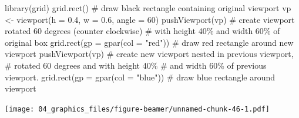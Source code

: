 \documentclass[
  9pt,
  a4paper,
  ignorenonframetext,
  notheorems]{beamer}
\newenvironment{Shaded}{\begin{snugshade}}{\end{snugshade}}
\newcommand{\AttributeTok}[1]{\textcolor[rgb]{0.40,0.45,0.13}{#1}}
\newcommand{\CommentTok}[1]{\textcolor[rgb]{0.37,0.37,0.37}{#1}}
\newcommand{\DecValTok}[1]{\textcolor[rgb]{0.68,0.00,0.00}{#1}}
\newcommand{\FloatTok}[1]{\textcolor[rgb]{0.68,0.00,0.00}{#1}}
\newcommand{\FunctionTok}[1]{\textcolor[rgb]{0.28,0.35,0.67}{#1}}
\newcommand{\NormalTok}[1]{\textcolor[rgb]{0.00,0.23,0.31}{#1}}
\newcommand{\OtherTok}[1]{\textcolor[rgb]{0.00,0.23,0.31}{#1}}
\newcommand{\StringTok}[1]{\textcolor[rgb]{0.13,0.47,0.30}{#1}}
\begin{document}
\begin{frame}[fragile]
\begin{Shaded}
\begin{Highlighting}[]
\FunctionTok{library}\NormalTok{(grid)}
\FunctionTok{grid.rect}\NormalTok{() }\CommentTok{\# draw black rectangle containing original viewport}
\NormalTok{vp }\OtherTok{\textless{}{-}} \FunctionTok{viewport}\NormalTok{(}\AttributeTok{h =} \FloatTok{0.4}\NormalTok{, }\AttributeTok{w =} \FloatTok{0.6}\NormalTok{, }\AttributeTok{angle =} \DecValTok{60}\NormalTok{)}
\FunctionTok{pushViewport}\NormalTok{(vp) }\CommentTok{\# create viewport rotated 60 degrees (counter clockwise)}
\CommentTok{\# with height 40\% and width 60\% of original box }
\FunctionTok{grid.rect}\NormalTok{(}\AttributeTok{gp =} \FunctionTok{gpar}\NormalTok{(}\AttributeTok{col =} \StringTok{"red"}\NormalTok{)) }\CommentTok{\# draw red rectangle around new viewport pushViewport(vp) }
\CommentTok{\# create new viewport nested in previous viewport,}
\CommentTok{\# rotated 60 degrees and with height 40\%}
\CommentTok{\# and width 60\% of previous viewport.}
\FunctionTok{grid.rect}\NormalTok{(}\AttributeTok{gp =} \FunctionTok{gpar}\NormalTok{(}\AttributeTok{col =} \StringTok{"blue"}\NormalTok{)) }\CommentTok{\# draw blue rectangle around viewport}
\end{Highlighting}
\end{Shaded}

\texttt{[image: 04\_graphics\_files/figure-beamer/unnamed-chunk-46-1.pdf]}
\end{frame}
\end{document}
